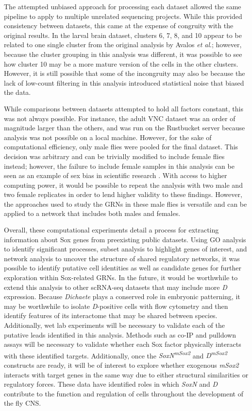 \documentclass[withindex,glossary]{cam-thesis}
\begin{document}
The attempted unbiased approach for processing each dataset allowed the
same pipeline to apply to multiple unrelated sequencing projects. While
this provided consistency between datasets, this came at the expense of
congruity with the original results. In the larval brain dataset,
clusters 6, 7, 8, and 10 appear to be related to one single cluster from
the original analysis by Avalos \emph{et al}.; however, because the
cluster grouping in this analysis was different, it was possible to see
how cluster 10 may be a more mature version of the cells in the other
clusters. However, it is still possible that some of the incongruity may
also be because the lack of low-count filtering in this analysis
introduced statistical noise that biased the data.

While comparisons between datasets attempted to hold all factors
constant, this was not always possible. For instance, the adult VNC
dataset was an order of magnitude larger than the others, and was run on
the Rustbucket server because analysis was not possible on a local
machine. However, for the sake of computational efficiency, only male
flies were pooled for the final dataset. This decision was arbitrary and
can be trivially modified to include female flies instead; however, the
failure to include female samples in this analysis can be seen as an
example of sex bias in scientific research . With
access to higher computing power, it would be possible to repeat the
analysis with two male and two female replicates in order to lend higher
validity to these findings. However, the approaches used to study the
GRNs in these male flies is versatile and can be applied to a network
that includes both males and females.

Overall, these computational experiments detail a process for extracting
information about Sox genes from preexisting public datasets. Using GO
analysis to identify significant processes, subset analysis to highlight
genes of interest, and network analysis to uncover the structure of shared regulatory networks, it was possible to identify putative cell 
identities as well as candidate genes for further exploration within
Sox-related GRNs. In the future, it would be worthwhile to extend this
analysis to other scRNA-seq datasets that may include more \emph{D}
expression. Because \emph{Dichaete} plays a conserved role in embryonic
patterning, it may be worthwhile to isolate \emph{D}-positive cells with
flow cytometry and then identify features of its interactome that may be
shared between species. Additionally, wet lab experiments will be
necessary to validate each of the putative leads identified in this
analysis. Methods such as co-IP and pulldown assays will be necessary to
validate whether each Sox factor physically interacts with these
identified targets. Additionally, once the
\emph{SoxN\textsuperscript{mSox2}} and \emph{D\textsuperscript{mSox2}}
constructs are ready, it will be of interest to explore whether
exogenous \emph{mSox2} interacts with target genes in the same way due
to either structural similarities or regulatory forces. These data have
identified roles in which \emph{SoxN} and \emph{D} contribute to the
function and regulation of cells throughout the development of the fly
CNS.
\end{document}

